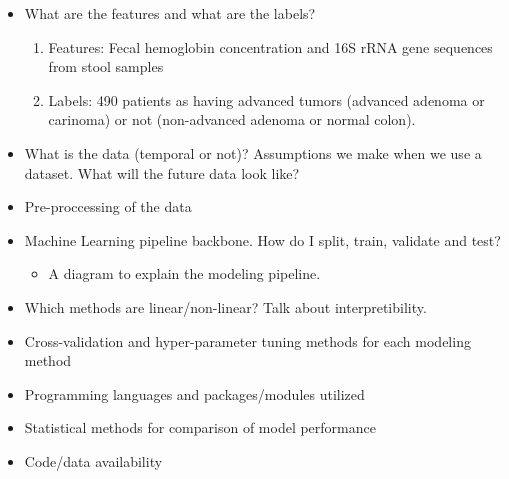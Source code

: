\documentclass[11pt,]{article}
\providecommand{\tightlist}{%
  \setlength{\itemsep}{0pt}\setlength{\parskip}{0pt}}
\begin{document}
\begin{itemize}
\item
  What are the features and what are the labels?

  \begin{enumerate}
  \def\labelenumi{\arabic{enumi}.}
  \item
    Features: Fecal hemoglobin concentration and 16S rRNA gene sequences
    from stool samples
  \item
    Labels: 490 patients as having advanced tumors (advanced adenoma or
    carinoma) or not (non-advanced adenoma or normal colon).
  \end{enumerate}
\item
  What is the data (temporal or not)? Assumptions we make when we use a
  dataset. What will the future data look like?
\item
  Pre-proccessing of the data
\item
  Machine Learning pipeline backbone. How do I split, train, validate
  and test?

  \begin{itemize}
  \tightlist
  \item
    A diagram to explain the modeling pipeline.
  \end{itemize}
\item
  Which methods are linear/non-linear? Talk about interpretibility.
\item
  Cross-validation and hyper-parameter tuning methods for each modeling
  method
\item
  Programming languages and packages/modules utilized
\item
  Statistical methods for comparison of model performance
\item
  Code/data availability
\end{itemize}
\end{document}
